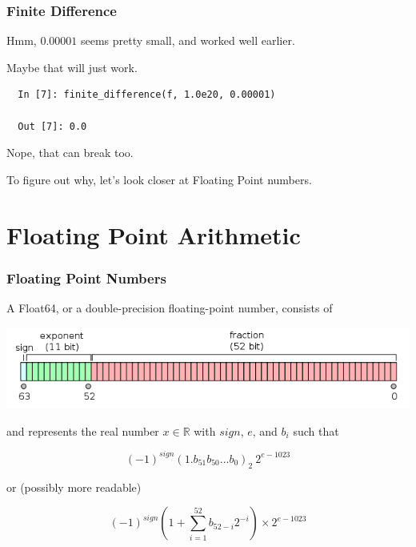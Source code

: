 \documentclass{beamer}
\def\R{\mathbb{R}}                     %
\begin{document}
\begin{frame}[fragile]
\frametitle{Finite Difference}

Hmm, $0.00001$ seems pretty small, and worked well earlier.

Maybe that will just work.

\pause

\begin{lstlisting}
  In [7]: finite_difference(f, 1.0e20, 0.00001)

  Out [7]: 0.0
\end{lstlisting}

Nope, that can break too.

To figure out why, let's look closer at Floating Point numbers.

\end{frame}

\section{Floating Point Arithmetic}


\begin{frame}

\frametitle{Floating Point Numbers}

A Float64, or a double-precision floating-point number, consists of

\includegraphics[scale=.4]{float-format.png}

and represents the real number $x \in \R$ with $sign$, $e$, and $b_i$ such that

\[ (-1)^{sign} (1.b_{51}b_{50}...b_{0})_2 \ 2^{e-1023} \]

or (possibly more readable)

\[ (-1)^{sign} \left ( 1 + \sum_{i=1}^{52} b_{52-i} 2^{-i} \right ) \times 2^{e-1023} \]

\end{frame}
\end{document}
